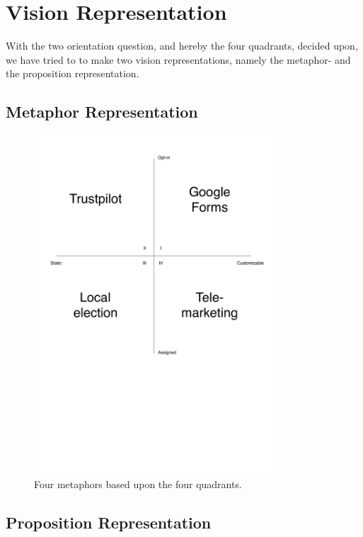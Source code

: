 
\section{Vision Representation}
\label{sec:vision_representation}

With the two orientation question, and hereby the four quadrants, decided upon, we have tried to to make two vision representations, namely the metaphor- and the proposition representation.

\subsection{Metaphor Representation}
\label{sub:metaphor_representation}

\begin{figure}[!htbp]
	\centering
	\includegraphics[width=0.8\textwidth]{graphic/problem_analysis/vision/metaphor.pdf}
	\caption{Four metaphors based upon the four quadrants.}
	\label{fig:metaphor}
\end{figure}
\FloatBarrier

\subsection{Proposition Representation}
\label{sub:proposition_representation}

